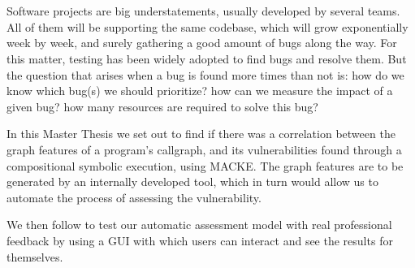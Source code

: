 \chapter{\abstractname}

Software projects are big understatements, usually developed by several teams. All of them will be supporting the same codebase, which will grow exponentially week by week, and surely gathering a good amount of bugs along the way.
For this matter, testing has been widely adopted to find bugs and resolve them. But the question that arises when a bug is found more times than not is: how do we know which bug(s) we should prioritize? how can we measure the impact of a given bug? how many resources are required to solve this bug?

In this Master Thesis we set out to find if there was a correlation between the graph features of a program's callgraph, and its vulnerabilities found through a compositional symbolic execution, using MACKE. The graph features are to be generated by an internally developed tool, which in turn would allow us to automate the process of assessing the vulnerability.

We then follow to test our automatic assessment model with real professional feedback by using a GUI with which users can interact and see the results for themselves. 